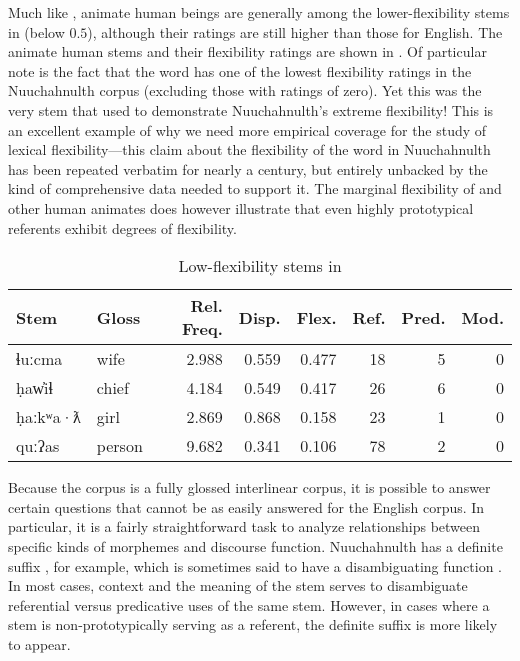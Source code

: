Much like , animate human beings are generally among the lower-flexibility stems in  (below $0.5$), although their ratings are still higher than those for English. The animate human stems and their flexibility ratings are shown in . Of particular note is the fact that the word   has one of the lowest flexibility ratings in the Nuuchahnulth corpus (excluding those with ratings of zero). Yet this was the very stem that \textcite{Swadesh1939b} used to demonstrate Nuuchahnulth's extreme flexibility! This is an excellent example of why we need more empirical coverage for the study of lexical flexibility—this claim about the flexibility of the word  in Nuuchahnulth has been repeated verbatim for nearly a century, but entirely unbacked by the kind of comprehensive data needed to support it. The marginal flexibility of  and other human animates does however illustrate that even highly prototypical referents exhibit degrees of flexibility.

\begin{table}
  \centering
  \caption{Low-flexibility stems in }
  \label{tab:Nuuchahnulth-low-flexibility}
  \begin{tabular}{ l l r r r r r r }
    \toprule
    Stem     & Gloss  & Rel. Freq. & Disp. & Flex. & Ref. & Pred. & Mod.\\
    \midrule
    ɬuːcma   & wife   & 2.988      & 0.559 & 0.477 & 18   & 5     & 0  \\
    ḥaw̓iɬ    & chief  & 4.184      & 0.549 & 0.417 & 26   & 6     & 0  \\
    ḥaːkʷa·ƛ & girl   & 2.869      & 0.868 & 0.158 & 23   & 1     & 0  \\
    quːʔas   & person & 9.682      & 0.341 & 0.106 & 78   & 2     & 0  \\
    \bottomrule
  \end{tabular}
\end{table}

Because the  corpus is a fully glossed interlinear corpus, it is possible to answer certain questions that cannot be as easily answered for the English corpus. In particular, it is a fairly straightforward task to analyze relationships between specific kinds of morphemes and discourse function. Nuuchahnulth has a definite suffix , for example, which is sometimes said to have a disambiguating function \parencites[60-63]{Mithun1999}[48]{Nakayama2001}. In most cases, context and the meaning of the stem serves to disambiguate referential versus predicative uses of the same stem. However, in cases where a stem is non-prototypically serving as a referent, the definite suffix is more likely to appear.


